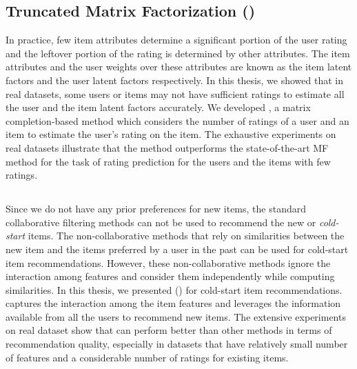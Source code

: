 \subsection*{Truncated Matrix Factorization (\TMF)}
In practice, few item attributes determine a significant portion of the user rating and the leftover portion
of the rating is determined by other attributes. The item attributes and the user weights over these attributes
are known as the item latent factors and the user latent factors respectively. In this thesis, we showed that
in real datasets,  some users or items may not have sufficient ratings to estimate all the user and the item
latent factors accurately.
We developed \TMF, a matrix completion-based method which considers the number of ratings of a user and an
item to estimate the user's rating on the item. The exhaustive experiments on real datasets illustrate that
the \TMF method outperforms the state-of-the-art MF method for the task of rating prediction for the users
and the items with few ratings.



\subsection*{\CFEXPB}
Since we do not have any prior preferences for new items, the standard collaborative filtering methods can
not be used to recommend the new or \emph{cold-start} items. The non-collaborative methods that rely on
similarities between the new item and the items preferred by a user in the past can be used for cold-start
item recommendations. However, these non-collaborative methods ignore the interaction among features and
consider them independently while computing similarities. In this thesis, we presented \CFEXP (\CF) for
cold-start item recommendations. \CF captures the interaction among the item features and leverages the
information available from all the users to recommend new items. 
The extensive experiments on real dataset show that \CF can perform better than other methods in terms of
recommendation quality, especially in datasets that have relatively small number of features and a
considerable number of ratings for existing items.  



